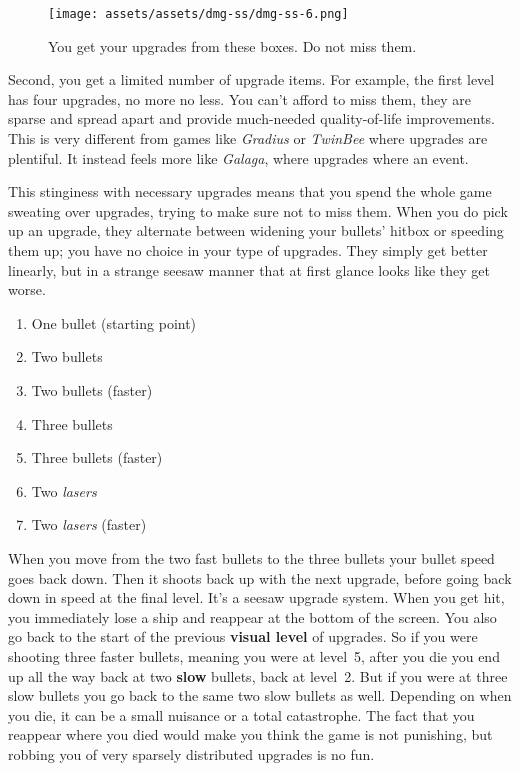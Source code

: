 \documentclass{book}
\begin{document}
\begin{figure}[hbt]
\vskip 10pt
\centering \texttt{[image: assets/assets/dmg-ss/dmg-ss-6.png]}\par\pagetwodescription You get your upgrades from these boxes. Do not miss them.
\vskip 6pt
\end{figure}

Second, you get a limited number of upgrade items. For example, the first level has four upgrades, no more no less. You can’t afford to miss them, they are sparse and spread apart and provide much-needed quality-of-life improvements. This is very different from games like \emph{Gradius} or \emph{TwinBee} where upgrades are plentiful. It instead feels more like \emph{Galaga}, where upgrades where an event.

This stinginess with necessary upgrades means that you spend the whole game sweating over upgrades, trying to make sure not to miss them. When you do pick up an upgrade, they alternate between widening your bullets’ hitbox or speeding them up; you have no choice in your type of upgrades. They simply get better linearly, but in a strange seesaw manner that at first glance looks like they get worse.

\begin{enumerate}
\item One bullet (starting point)
\item Two bullets
\item Two bullets (faster)
\item Three bullets
\item Three bullets (faster)
\item Two \emph{lasers}
\item Two \emph{lasers} (faster)
\end{enumerate}\noindent

When you move from the two fast bullets to the three bullets your bullet speed goes back down. Then it shoots back up with the next upgrade, before going back down in speed at the final level. It’s a seesaw upgrade system. When you get hit, you immediately lose a ship and reappear at the bottom of the screen. You also go back to the start of the previous \textbf{visual level} of upgrades. So if you were shooting three faster bullets, meaning you were at level 5, after you die you end up all the way back at two \textbf{slow} bullets, back at level 2. But if you were at three slow bullets you go back to the same two slow bullets as well. Depending on when you die, it can be a small nuisance or a total catastrophe. The fact that you reappear where you died would make you think the game is not punishing, but robbing you of very sparsely distributed upgrades is no fun.
\end{document}
